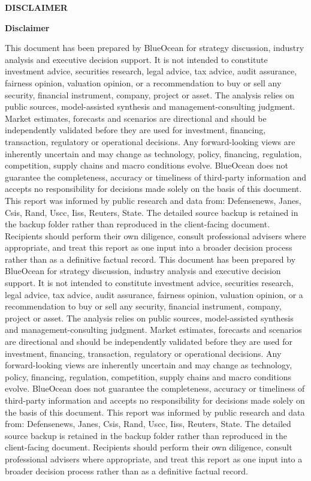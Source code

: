 \documentclass[10pt,a4paper]{article}
\begin{document}
\clearpage
{\textcolor{BOBlue}{\scriptsize\bfseries DISCLAIMER}}\par\vspace{3pt}
{\Large\sffamily\bfseries\color{BONavy} Disclaimer}\par\vspace{4pt}
\vspace{2pt}{\color{BOBright}\rule{\linewidth}{1pt}}\vspace{5pt}
{\footnotesize\color{BOMuted} This document has been prepared by BlueOcean for strategy discussion, industry analysis and executive decision support. It is not intended to constitute investment advice, securities research, legal advice, tax advice, audit assurance, fairness opinion, valuation opinion, or a recommendation to buy or sell any security, financial instrument, company, project or asset. The analysis relies on public sources, model-assisted synthesis and management-consulting judgment. Market estimates, forecasts and scenarios are directional and should be independently validated before they are used for investment, financing, transaction, regulatory or operational decisions. Any forward-looking views are inherently uncertain and may change as technology, policy, financing, regulation, competition, supply chains and macro conditions evolve. BlueOcean does not guarantee the completeness, accuracy or timeliness of third-party information and accepts no responsibility for decisions made solely on the basis of this document. This report was informed by public research and data from: Defensenews, Janes, Csis, Rand, Uscc, Iiss, Reuters, State. The detailed source backup is retained in the backup folder rather than reproduced in the client-facing document. Recipients should perform their own diligence, consult professional advisers where appropriate, and treat this report as one input into a broader decision process rather than as a definitive factual record. This document has been prepared by BlueOcean for strategy discussion, industry analysis and executive decision support. It is not intended to constitute investment advice, securities research, legal advice, tax advice, audit assurance, fairness opinion, valuation opinion, or a recommendation to buy or sell any security, financial instrument, company, project or asset. The analysis relies on public sources, model-assisted synthesis and management-consulting judgment. Market estimates, forecasts and scenarios are directional and should be independently validated before they are used for investment, financing, transaction, regulatory or operational decisions. Any forward-looking views are inherently uncertain and may change as technology, policy, financing, regulation, competition, supply chains and macro conditions evolve. BlueOcean does not guarantee the completeness, accuracy or timeliness of third-party information and accepts no responsibility for decisions made solely on the basis of this document. This report was informed by public research and data from: Defensenews, Janes, Csis, Rand, Uscc, Iiss, Reuters, State. The detailed source backup is retained in the backup folder rather than reproduced in the client-facing document. Recipients should perform their own diligence, consult professional advisers where appropriate, and treat this report as one input into a broader decision process rather than as a definitive factual record.}
\end{document}
